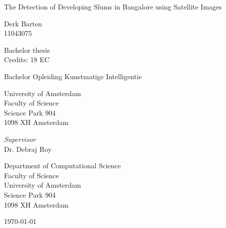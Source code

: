 \begin{center}

\vspace{1.7cm}

\begin{Huge}
The Detection of Developing Slums in Bangalore using Satellite Images
\end{Huge}

\vspace{1.5cm}

Derk Barten\\
11043075

\vspace{1.5cm}

Bachelor thesis\\
Credits: 18 EC

\vspace{0.5cm}

Bachelor Opleiding Kunstmatige Intelligentie

\vspace{0.25cm}

University of Amsterdam\\
Faculty of Science\\
Science Park 904\\
1098 XH Amsterdam

\vspace{4cm}

\emph{Supervisor}\\
Dr. Debraj Roy

\vspace{0.25cm}

Department of Computational Science\\
Faculty of Science\\
University of Amsterdam\\
Science Park 904\\
1098 XH  Amsterdam

\vspace{1.5cm}

\today

\end{center}

